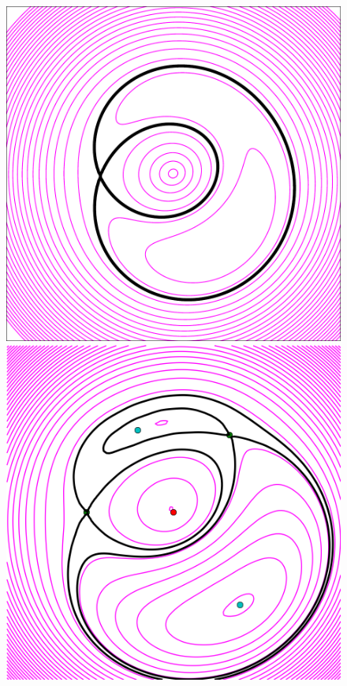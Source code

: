 \documentclass[usenatbib]{mn2e}
\newlength{\myplotswidth}
\begin{document}
\begin{figure}
  \includegraphics[width=\myplotswidth]{fig/ASW0002z6f_006919_arriv}
  \includegraphics[width=\myplotswidth]{fig/006919_spaghetti} \\

\end{figure}
\end{document}
